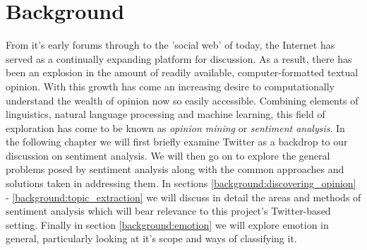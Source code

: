 

\chapter{Background}
\label{background}

From it's early forums through to the 'social web' of today, the Internet has served as a continually expanding platform for discussion. As a result, there has been an explosion in the amount of readily available, computer-formatted textual opinion. With this growth has come an increasing desire to computationally understand the wealth of opinion now so easily accessible. Combining elements of linguistics, natural language processing and machine learning, this field of exploration has come to be known as \emph{opinion mining} or \emph{sentiment analysis}. In the following chapter we will first briefly examine Twitter as a backdrop to our discussion on sentiment analysis. We will then go on to explore the general problems posed by sentiment analysis along with the common approaches and solutions taken in addressing them. In sections \ref{background:discovering_opinion} - \ref{background:topic_extraction} we will discuss in detail the areas and methods of sentiment analysis which will bear relevance to this project's Twitter-based setting. Finally in section \ref{background:emotion} we will explore emotion in general, particularly looking at it's scope and ways of classifying it.

